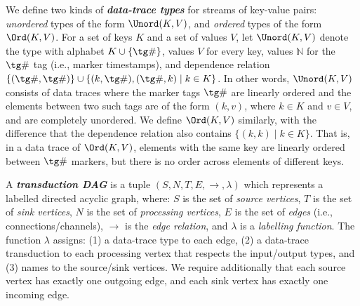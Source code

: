 We define two kinds of \textbf{\em data-trace types} for streams of key-value pairs: \emph{unordered} types of the form $\Unord(K,V)$, and \emph{ordered} types of the form $\Ord(K,V)$. For a set of keys $K$ and a set of values $V$, let $\Unord(K, V)$ denote the type with alphabet $K \cup \{\tg\#\}$, values $V$ for every key, values $\mathbb{N}$ for the $\tg\#$ tag (i.e., marker timestamps), and dependence relation $\{ (\tg\#, \tg\#) \} \cup \{ (k,\tg\#), (\tg\#,k) \mid k \in K \}$. In other words, $\Unord(K, V)$ consists of data traces where the marker tags $\tg\#$ are linearly ordered and the elements between two such tags are of the form $(k,v)$, where $k \in K$ and $v \in V$, and are completely unordered. We define $\Ord(K, V)$ similarly, with the difference that the dependence relation also contains $\{ (k,k) \mid k \in K \}$. That is, in a data trace of $\Ord(K,V)$, elements with the same key are linearly ordered between $\tg\#$ markers, but there is no order across elements of different keys.

A \textbf{\em transduction DAG} is a tuple $(S,N,T,E,\to,\lambda)$ which represents a labelled directed acyclic graph, where: $S$ is the set of \emph{source vertices}, $T$ is the set of \emph{sink vertices}, $N$ is the set of \emph{processing vertices}, $E$ is the set of \emph{edges} (i.e., connections/channels), $\to$ is the \emph{edge relation}, and $\lambda$ is a \emph{labelling function}. The function $\lambda$ assigns: (1) a data-trace type to each edge, (2) a data-trace transduction to each processing vertex that respects the input/output types, and (3) names to the source/sink vertices. We require additionally that each source vertex has exactly one outgoing edge, and each sink vertex has exactly one incoming edge.

